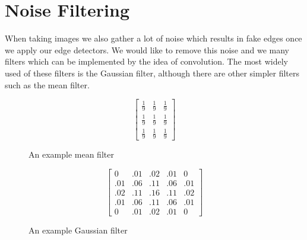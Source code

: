 \documentclass{article}
\begin{document}
	\section{Noise Filtering}
	When taking images we also gather a lot of noise which results in fake edges once we apply our edge detectors. We would like to remove this noise and we many filters which can be implemented by the idea of convolution. The most widely used of these filters is the Gaussian filter, although there are other simpler filters such as the mean filter.
	\begin{figure}[ht]
	\begin{minipage}{.5\textwidth}
			\begingroup
			\renewcommand*{\arraystretch}{1.7}	
			\centering
			\[ \begin{bmatrix} \frac{1}{9} & \frac{1}{9} & \frac{1}{9} \\
								\frac{1}{9} & \frac{1}{9} & \frac{1}{9} \\
								\frac{1}{9} & \frac{1}{9} & \frac{1}{9}
			\end{bmatrix} \]
			\endgroup
			\caption{An example mean filter}
			\label{fig:mean filter}
	\end{minipage}
	\begin{minipage}{.5\textwidth}
		\centering
		\[ \begin{bmatrix} 0 & .01 & .02 & .01 & 0 \\
								.01 & .06 & .11 & .06 & .01 \\ 
							    .02 & .11 & .16 & .11 & .02 \\
							    .01 & .06 & .11 & .06 & .01 \\
							    0 & .01 & .02 & .01 & 0
				\end{bmatrix} \]
		\caption{An example Gaussian filter}
		\label{fig:gaussian filter}

	\end{minipage}
	\end{figure}
	
\end{document}
